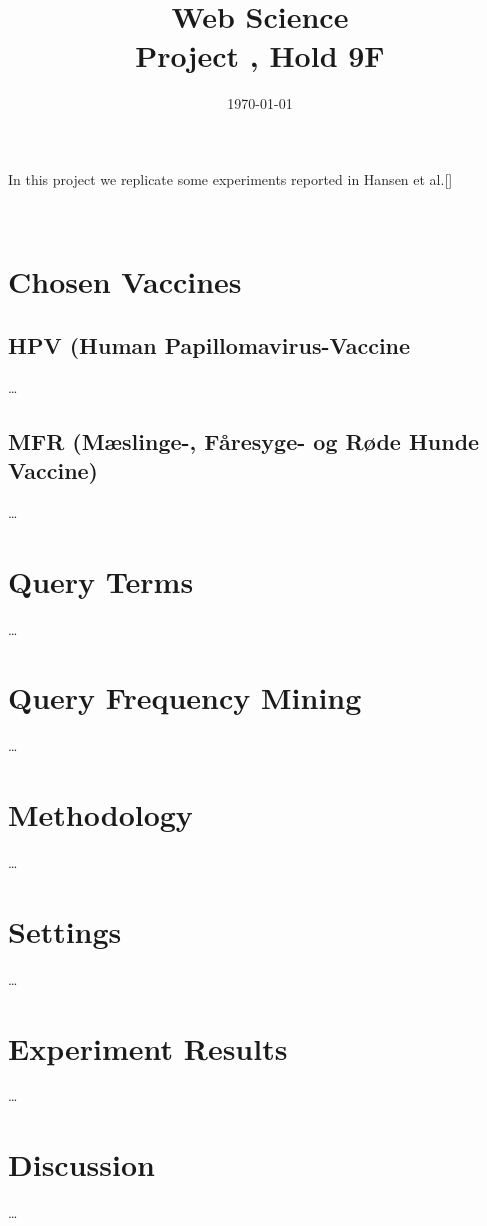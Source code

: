\documentclass[10pt,a4paper]{article}
\title
{
    Web Science \\
    {\Large Project \assignmentnumber, Hold 9F}
}
\author
{
    \authform{Casper B. Hansen}{fvx507}
}
\date{\today}
\newcommand{\theabstract}
{
    In this project we replicate some experiments reported in Hansen et al.[]
}
\newcommand{\colbreak}{{\ }\vfill\columnbreak}
\begin{document}
\clearpage
\maketitle

\setlength{\columnsep}{0pt}
\begin{multicols}{2}
    \theabstract
    \colbreak
    \tableofcontents
\end{multicols}
\setlength{\columnsep}{10pt}




\begin{multicols}{2}
    \section{Chosen Vaccines}

    \subsection{HPV (Human Papillomavirus-Vaccine}
    \dots

    \subsection{MFR (Mæslinge-, Fåresyge- og Røde Hunde Vaccine)}
    \dots

    \section{Query Terms}
    \dots

    \section{Query Frequency Mining}
    \dots

    \section{Methodology}
    \dots

    \section{Settings}
    \dots

    \section{Experiment Results}
    \dots

    \section{Discussion}
    \dots


\end{multicols}
\end{document}
